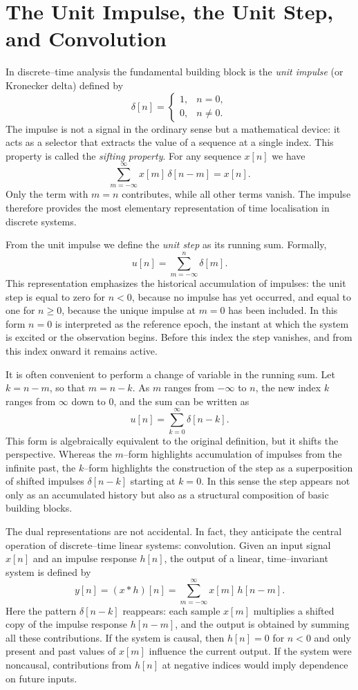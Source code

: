 \documentclass[12pt,a4paper]{article}
\begin{document}
	
	\section*{The Unit Impulse, the Unit Step, and Convolution}
	
	In discrete--time analysis the fundamental building block is the \emph{unit impulse} (or Kronecker delta) defined by
	$$
	\delta[n] =
	\begin{cases}
		1, & n = 0, \\
		0, & n \neq 0.
	\end{cases}
	$$
	The impulse is not a signal in the ordinary sense but a mathematical device: it acts as a selector that extracts the value of a sequence at a single index. This property is called the \emph{sifting property}. For any sequence $x[n]$ we have
	$$
	\sum_{m=-\infty}^{\infty} x[m]\,\delta[n-m] = x[n].
	$$
	Only the term with $m=n$ contributes, while all other terms vanish. The impulse therefore provides the most elementary representation of time localisation in discrete systems.
	
	From the unit impulse we define the \emph{unit step} as its running sum. Formally,
	$$
	u[n] = \sum_{m=-\infty}^{n} \delta[m].
	$$
	This representation emphasizes the historical accumulation of impulses: the unit step is equal to zero for $n<0$, because no impulse has yet occurred, and equal to one for $n\geq 0$, because the unique impulse at $m=0$ has been included. In this form $n=0$ is interpreted as the reference epoch, the instant at which the system is excited or the observation begins. Before this index the step vanishes, and from this index onward it remains active.
	
	It is often convenient to perform a change of variable in the running sum. Let $k=n-m$, so that $m=n-k$. As $m$ ranges from $-\infty$ to $n$, the new index $k$ ranges from $\infty$ down to $0$, and the sum can be written as
	$$
	u[n] = \sum_{k=0}^{\infty} \delta[n-k].
	$$
	This form is algebraically equivalent to the original definition, but it shifts the perspective. Whereas the $m$--form highlights accumulation of impulses from the infinite past, the $k$--form highlights the construction of the step as a superposition of shifted impulses $\delta[n-k]$ starting at $k=0$. In this sense the step appears not only as an accumulated history but also as a structural composition of basic building blocks.
	
	The dual representations are not accidental. In fact, they anticipate the central operation of discrete--time linear systems: convolution. Given an input signal $x[n]$ and an impulse response $h[n]$, the output of a linear, time--invariant system is defined by
	$$
	y[n] = (x*h)[n] = \sum_{m=-\infty}^{\infty} x[m]\,h[n-m].
	$$
	Here the pattern $\delta[n-k]$ reappears: each sample $x[m]$ multiplies a shifted copy of the impulse response $h[n-m]$, and the output is obtained by summing all these contributions. If the system is causal, then $h[n]=0$ for $n<0$ and only present and past values of $x[m]$ influence the current output. If the system were noncausal, contributions from $h[n]$ at negative indices would imply dependence on future inputs.
	
\end{document}
